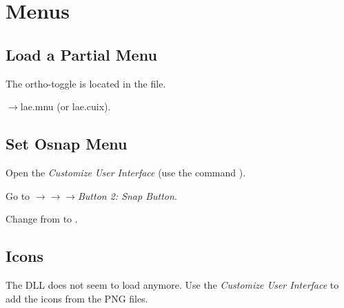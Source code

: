 \section{Menus}
\subsection{Load a Partial Menu}
The  ortho-toggle is located in the  file.
\begin{bulletedlist}
	\item {}$\rightarrow$lae.mnu (or lae.cuix).
\end{bulletedlist}

\subsection{Set Osnap Menu}
\begin{numberedlist}
	\item Open the \textit{Customize User Interface} (use the command ).
	\item Go to $\rightarrow$$\rightarrow$$\rightarrow$\textit{Button 2: Snap Button}.
	\item Change  from  to .
\end{numberedlist}

\subsection{Icons}
The DLL does not seem to load anymore.  Use the \textit{Customize User Interface} to add the icons from the PNG files.
